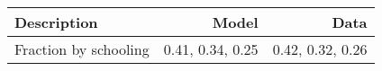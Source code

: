 \begin{tabular}{lrr}
\hline
Description & Model  & Data  \\ 
\hline
Fraction by schooling & 0.41, 0.34, 0.25  & 0.42, 0.32, 0.26  \\ 
\hline
\end{tabular}%
